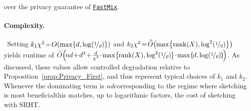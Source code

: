\documentclass[11pt]{article}
\theoremstyle{definition}
\theoremstyle{plain}
\providecommand{\propositionref}[1]{Proposition~\ref{#1}}
\newcommand{\FastMix}{\hyperref[alg:fast_mixing]{\texttt{FastMix}}\xspace}
\begin{document}
over the privacy guarantee of \FastMix. 

\paragraph{Complexity.} \ Setting $k_1\chi^2 \hspace{-0.15em}=\hspace{-0.15em} O(\max\hspace{-0.15em}\left\{d, \log(\nicefrac{1}{\varrho})\right\})$ and $k_2\chi^2 \hspace{-0.15em}=\hspace{-0.15em} \widetilde{O}\hspace{-0.15em}\left(\max\hspace{-0.15em}\left\{\mathrm{rank}(X), \log^2(\nicefrac{1}{\varrho})\right\}\right)$ yields runtime of $\widetilde{O}\hspace{-0.15em}\left(\hspace{-0.15em}nd \hspace{-0.15em}+\hspace{-0.15em} d^3\hspace{-0.15em}+\hspace{-0.15em} \frac{d}{\chi^4}\hspace{-0.15em}\cdot\hspace{-0.15em} \max\hspace{-0.15em}\left\{\hspace{-0.1em}\mathrm{rank}(X), \log^2(\nicefrac{1}{\varrho})\hspace{-0.1em}\right\}\hspace{-0.15em}\cdot\hspace{-0.15em} \max\hspace{-0.15em}\left\{\hspace{-0.1em}d, \log(\nicefrac{1}{\varrho})\hspace{-0.1em}\right\}\hspace{-0.15em}\right)$. As discussed, these values allow controlled degradation relative to \propositionref{prop:Privacy_First}, and thus represent typical choices of $k_1$ and $k_2$. Whenever the dominating term is $nd$\textemdash{}corresponding to the regime where sketching is most beneficial\textemdash{}this matches, up to logarithmic factors, the cost of sketching with SRHT.
\end{document}

